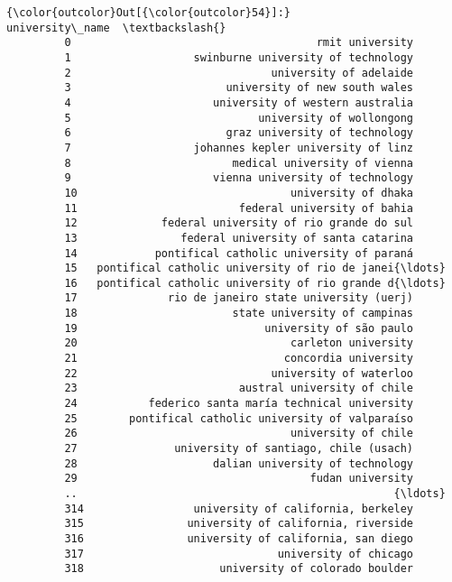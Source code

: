 \documentclass[11pt]{article}
\begin{document}
\begin{Verbatim}[commandchars=\\\{\}]
{\color{outcolor}Out[{\color{outcolor}54}]:}                                        university\_name  \textbackslash{}
         0                                      rmit university   
         1                   swinburne university of technology   
         2                               university of adelaide   
         3                        university of new south wales   
         4                      university of western australia   
         5                             university of wollongong   
         6                        graz university of technology   
         7                   johannes kepler university of linz   
         8                         medical university of vienna   
         9                      vienna university of technology   
         10                                 university of dhaka   
         11                         federal university of bahia   
         12             federal university of rio grande do sul   
         13                federal university of santa catarina   
         14            pontifical catholic university of paraná   
         15   pontifical catholic university of rio de janei{\ldots}   
         16   pontifical catholic university of rio grande d{\ldots}   
         17              rio de janeiro state university (uerj)   
         18                        state university of campinas   
         19                             university of são paulo   
         20                                 carleton university   
         21                                concordia university   
         22                              university of waterloo   
         23                         austral university of chile   
         24           federico santa maría technical university   
         25        pontifical catholic university of valparaíso   
         26                                 university of chile   
         27               university of santiago, chile (usach)   
         28                     dalian university of technology   
         29                                    fudan university   
         ..                                                 {\ldots}   
         314                 university of california, berkeley   
         315                university of california, riverside   
         316                university of california, san diego   
         317                              university of chicago   
         318                     university of colorado boulder   

\end{Verbatim}
\end{document}
